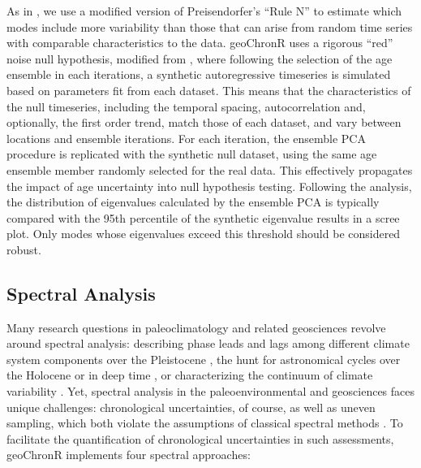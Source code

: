 \documentclass[gchron, manuscript]{copernicus}
\begin{document}
As in \citet{anchukaitis2013mceof}, we use a modified version of Preisendorfer's ``Rule N'' \citep{PreisendorferMobley1988} to estimate which modes include more variability than those that can arise from random time series with comparable characteristics to the data.
geoChronR uses a rigorous ``red'' noise null hypothesis, modified from \citet{SchneiderNeumaier2001}, where following the selection of the age ensemble in each iterations, a synthetic autoregressive timeseries is simulated based on parameters fit from each dataset.
This means that the characteristics of the null timeseries, including the temporal spacing, autocorrelation and, optionally, the first order trend, match those of each dataset, and vary between locations and ensemble iterations.
For each iteration, the ensemble PCA procedure is replicated with the synthetic null dataset, using the same age ensemble member randomly selected for the real data.
This effectively propagates the impact of age uncertainty into null hypothesis testing.
Following the analysis, the distribution of eigenvalues calculated by the ensemble PCA is typically compared with the 95th percentile of the synthetic eigenvalue results in a scree plot.
Only modes whose eigenvalues exceed this threshold should be considered robust.

\hypertarget{sec:spec-theory}{%
\subsection{Spectral Analysis}\label{sec:spec-theory}}

Many research questions in paleoclimatology and related geosciences revolve around spectral analysis: describing phase leads and lags among different climate system components over the Pleistocene \citep[e.g.,][]{imbrie1984orbital, LisieckiRaymo05, khider2017}, the hunt for astronomical cycles over the Holocene \citep{bond2001} or in deep time \citep{MeyersSageman_2007, Meyers_2012, Meyers_2015, lisiecki2010}, or characterizing the continuum of climate variability \citep{Huybers_Curry2006, ZhuPNAS2019}.
Yet, spectral analysis in the paleoenvironmental and geosciences faces unique challenges: chronological uncertainties, of course, as well as uneven sampling, which both violate the assumptions of classical spectral methods \citep{Ghil02}.
To facilitate the quantification of chronological uncertainties in such assessments, geoChronR implements four spectral approaches:
\end{document}
